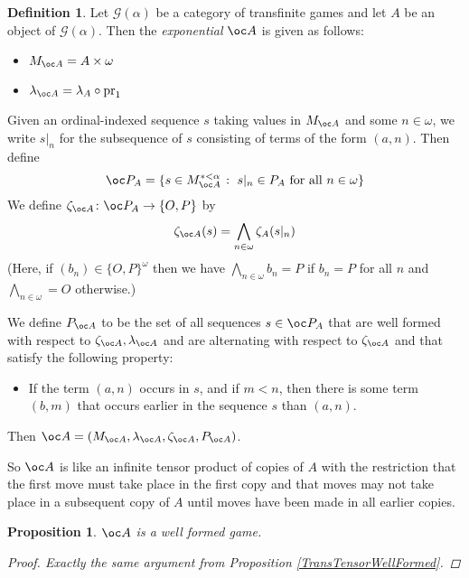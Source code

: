 \documentclass[11pt]{article} %
\theoremstyle{plain} %
\newtheorem{proposition}[theorem]{Proposition}
\theoremstyle{definition} %
\newtheorem{definition}[theorem]{Definition}
\theoremstyle{note}
\theoremstyle{exercisestyle}
\newcommand*\from{\colon}
\DeclareMathOperator{\pr}{pr}
\newcommand{\G}{\mathcal G}
\newcommand{\suchthat}{\;\colon\;}
\newcommand{\OP}{\{O,P\}}
\begin{document}
\begin{definition}
  Let $\G(\alpha)$ be a category of transfinite games and let $A$ be an object of $\G(\alpha)$.  Then the \emph{exponential} $\oc A$ is given as follows:
  \begin{itemize}
    \item $M_{\oc A} = A\times\omega$
    \item $\lambda_{\oc A} = \lambda_A\circ\pr_1$
  \end{itemize}

  Given an ordinal-indexed sequence $s$ taking values in $M_{\oc A}$ and some $n\in\omega$, we write $s\vert_n$ for the subsequence of $s$ consisting of terms of the form $(a,n)$.  Then define
  \[
    \oc P_A = \{s\in M_{\oc A}^{*<\alpha}\suchthat s\vert_n\in P_A\textrm{ for all }n\in \omega\}
    \]
  We define $\zeta_{\oc A}\from \oc P_A\to \OP$ by
  \[
    \zeta_{\oc A}(s) = \bigwedge_{n\in \omega} \zeta_A(s\vert_n)
    \]
  (Here, if $(b_n)\in\OP^\omega$ then we have $\bigwedge_{n\in\omega} b_n = P$ if $b_n=P$ for all $n$ and $\bigwedge_{n\in\omega}=O$ otherwise.)

  We define $P_{\oc A}$ to be the set of all sequences $s\in\oc P_A$ that are well formed with respect to $\zeta_{\oc A},\lambda_{\oc A}$ and are alternating with respect to $\zeta_{\oc A}$ and that satisfy the following property:
  
  \begin{itemize}
    \item If the term $(a,n)$ occurs in $s$, and if $m<n$, then there is some term $(b,m)$ that occurs earlier in the sequence $s$ than $(a,n)$.  
  \end{itemize}

  Then $\oc A=(M_{\oc A},\lambda_{\oc A},\zeta_{\oc A},P_{\oc A})$.  
\end{definition}

So $\oc A$ is like an infinite tensor product of copies of $A$ with the restriction that the first move must take place in the first copy and that moves may not take place in a subsequent copy of $A$ until moves have been made in all earlier copies.  

\begin{proposition}
  $\oc A$ is a well formed game.
  \begin{proof}
    Exactly the same argument from Proposition \ref{TransTensorWellFormed}.
  \end{proof}
\end{proposition}
\end{document}
